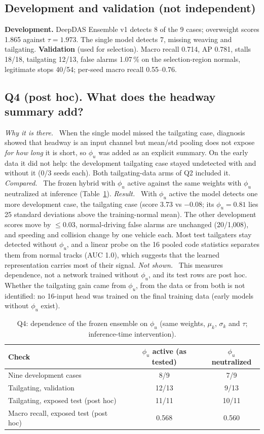 \documentclass[10pt,a4paper,twocolumn]{article}
\newcommand{\EDIV}{DeepDAS Ensemble v1}\newcommand{\dev}{\textit{development}}\newcommand{\val}{\textit{validation}}\newcommand{\ft}{\textit{final test}}
\newcommand{\lab}[1]{\textit{#1}\ }
\begin{document}
\subsection{Development and validation (not independent)}
\textbf{Development.} \EDIV{} detects 8 of the 9 cases; overweight scores 1.865 against $\tau=1.973$. The single model detects 7, missing weaving and tailgating. \textbf{Validation} (used for selection). Macro recall 0.714, AP 0.781, stalls 18/18, tailgating 12/13, false alarms 1.07\,\% on the selection-region normals, legitimate stops 40/54; per-seed macro recall 0.55--0.76.

\subsection{Q4 (post hoc). What does the headway summary add?}\label{sec:q4}
\lab{Why it is there.} When the single model missed the tailgating case, diagnosis showed that headway is an input channel but mean/std pooling does not expose \emph{for how long} it is short, so $\phi_u$ was added as an explicit summary. On the early data it did not help: the development tailgating case stayed undetected with and without it (0/3 seeds each). Both tailgating-data arms of Q2 included it. \lab{Compared.} The frozen hybrid with $\phi_u$ active against the same weights with $\phi_u$ neutralized at inference (Table~\ref{tab:phi}). \lab{Result.} With $\phi_u$ active the model detects one more development case, the tailgating case (score 3.73 vs $-0.08$; its $\phi_u=0.81$ lies 25 standard deviations above the training-normal mean). The other development scores move by $\le$0.03, normal-driving false alarms are unchanged (20/1{,}008), and speeding and collision change by one vehicle each. Most test tailgaters stay detected without $\phi_u$, and a linear probe on the 16 pooled code statistics separates them from normal tracks (AUC 1.0), which suggests that the learned representation carries most of their signal. \lab{Not shown.} This measures dependence, not a network trained without $\phi_u$, and its test rows are post hoc. Whether the tailgating gain came from $\phi_u$, from the data or from both is not identified: no 16-input head was trained on the final training data (early models without $\phi_u$ exist).
\begin{table}[h]\centering\footnotesize\setlength{\tabcolsep}{3pt}
\caption{Q4: dependence of the frozen ensemble on $\phi_u$ (same weights, $\mu_k$, $\sigma_k$ and $\tau$; inference-time intervention).}\label{tab:phi}
\begin{tabular}{@{}lcc@{}}\toprule
Check & $\phi_u$ active (as tested) & $\phi_u$ neutralized \\\midrule
Nine development cases & 8/9 & 7/9 \\
Tailgating, validation & 12/13 & 9/13 \\
Tailgating, exposed test (post hoc) & 11/11 & 10/11 \\
Macro recall, exposed test (post hoc) & 0.568 & 0.560 \\\bottomrule
\end{tabular}\end{table}
\end{document}
